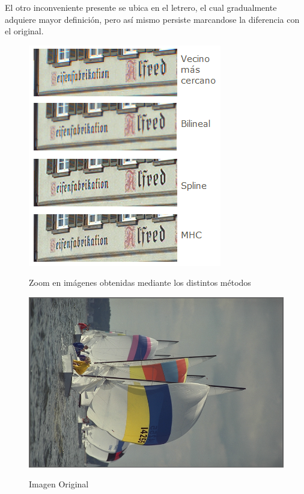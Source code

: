 \documentclass[a4paper]{article}
\begin{document}
El otro inconveniente presente se ubica en el letrero, el cual gradualmente adquiere mayor definici\'on, pero as\'i mismo persiste marcandose la diferencia con el original. \\

\begin{figure}[h!]
    \caption{Zoom en imágenes obtenidas mediante los distintos métodos}
    \begin{center}
    \includegraphics[scale=0.9]{imagenes/comparacion/04/letrero}
    \label{letrero}
  \end{center}
\end{figure}

\newpage

\begin{figure}[h!]
    \caption{Imagen Original}
    \begin{center}
    \includegraphics[scale=0.15]{imagenes/comparacion/05/img5}
    \label{imgOri2}
  \end{center}
\end{figure}
\end{document}
